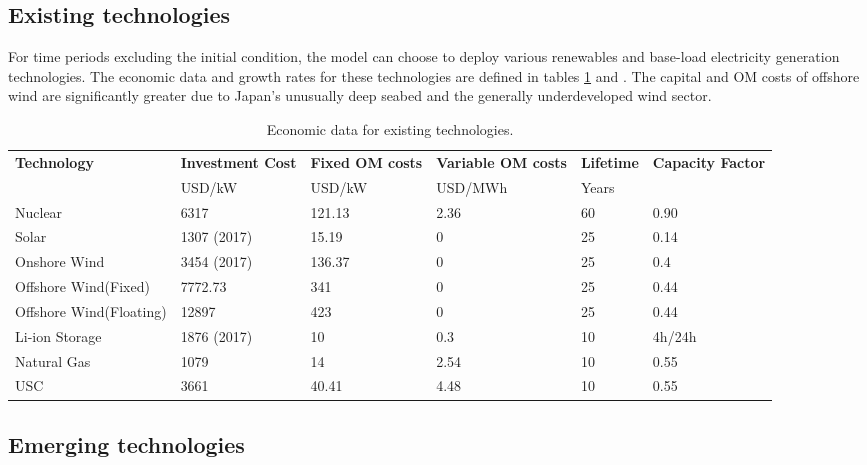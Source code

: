 \subsection{Existing technologies}

For time periods excluding the initial condition, the model can choose to deploy various renewables and base-load electricity generation technologies. The economic data and growth rates for these technologies are defined in tables \ref{existing-eco} and . The capital and \gls{OM} costs of offshore wind are significantly greater due to Japan's unusually deep seabed and the generally underdeveloped wind sector.

\begin{table}[!ht]
	\caption{Economic data for existing technologies.}
	\vspace{0.1in}
	\begin{tabularx}{\textwidth}{p{} p{} p{} p{}  p{} p{}}
		\hline
\textbf{Technology} & \textbf{Investment Cost} & \textbf{Fixed \gls{OM} costs} & \textbf{Variable \gls{OM} costs} & \textbf{Lifetime} & \textbf{Capacity Factor}\\
  & USD/kW & USD/kW & USD/MWh & Years & \\
\hline
Nuclear & 6317 & 121.13 & 2.36 & 60 & 0.90\\
Solar & 1307 (2017) & 15.19 & 0 & 25 & 0.14\\
Onshore Wind & 3454 (2017) & 136.37 & 0 & 25 & 0.4\\
Offshore Wind(Fixed) & 7772.73 & 341 & 0 & 25 & 0.44\\
Offshore Wind(Floating) & 12897 & 423 & 0 & 25 & 0.44\\
Li-ion Storage & 1876 (2017) & 10 & 0.3 & 10 & 4h/24h \\
Natural Gas &  1079 & 14 & 2.54 & 10 & 0.55 \\
\gls{USC} & 3661 & 40.41 & 4.48 & 10 & 0.55 \\
\hline 
\end{tabularx}
\label{existing-eco}
\end{table}

\subsection{Emerging technologies}

